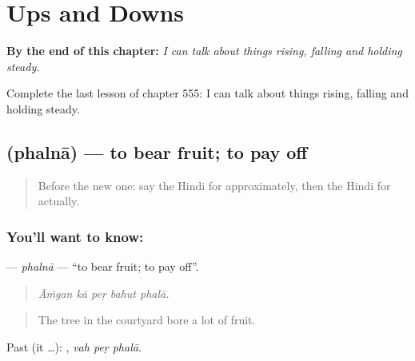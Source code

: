 
\chapter{Ups and Downs}
\label{ch:hi-ups-and-downs}

\begin{chapteropening}
\textbf{By the end of this chapter:} \emph{I can talk about things rising, falling and holding steady.}

Complete the last lesson of chapter 555: I can talk about things rising, falling and holding steady.
\end{chapteropening}

\section[\texorpdfstring{\hi{फलना} (phalnā)}{फलना (phalnā)}]{ (phalnā) — to bear fruit; to pay off}

\label{lesson:HI-C555-phalna}



\begin{quote}
Before the new one: say the Hindi for approximately, then the Hindi for actually.
\end{quote}

\subsection*{You'll want to know: }
\textbf{} — \emph{phalnā} — \textquotedblleft{}to bear fruit; to pay off\textquotedblright{}.

\begin{quote}
    
\end{quote}

\begin{quote}
\emph{Āṁgan kā peṛ bahut phalā.}
\end{quote}

\begin{quote}
The tree in the courtyard bore a lot of fruit.
\end{quote}

Past (it …):   , \emph{vah peṛ phalā}.

